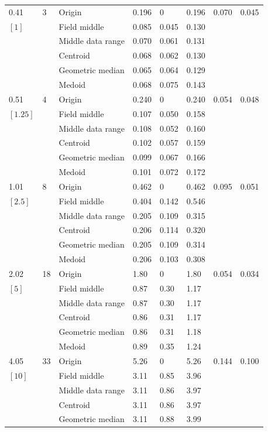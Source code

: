 \documentclass[phd]{ndsu-thesis-2022}
\begin{document}
{{\begin{ThreePartTable}
\begin{longtable}{lll lll ll}
0.41 & 3 & Origin  & 0.196 & 0 & 0.196 & 0.070 & 0.045 \\
$[1]$ &  & Field middle  & 0.085 & 0.045 & 0.130 \\
 &  & Middle data range  & 0.070 & 0.061 & 0.131 \\
 &  & Centroid & 0.068 & 0.062 & 0.130 \\
 &  & Geometric median & 0.065 & 0.064 & 0.129 \\
 &  & Medoid  & 0.068 & 0.075 & 0.143 \\
\midrule
0.51 & 4 & Origin  & 0.240 & 0 & 0.240 & 0.054 & 0.048 \\
$[1.25]$ &  & Field middle  & 0.107 & 0.050 & 0.158 \\
 &  & Middle data range  & 0.108 & 0.052 & 0.160 \\
 &  & Centroid & 0.102 & 0.057 & 0.159 \\
 &  & Geometric median & 0.099 & 0.067 & 0.166 \\
 &  & Medoid  & 0.101 & 0.072 & 0.172 \\
\midrule
1.01 & 8 & Origin  & 0.462 & 0 & 0.462 & 0.095 & 0.051 \\
$[2.5]$ &  & Field middle  & 0.404 & 0.142 & 0.546 \\
 &  & Middle data range  & 0.205 & 0.109 & 0.315 \\
 &  & Centroid & 0.206 & 0.114 & 0.320 \\
 &  & Geometric median & 0.205 & 0.109 & 0.314 \\
 &  & Medoid  & 0.206 & 0.103 & 0.308 \\
\midrule
2.02 & 18 & Origin  & 1.80 & 0 & 1.80 & 0.054 & 0.034 \\
$[5]$ &  & Field middle  & 0.87 & 0.30 & 1.17 \\
 &  & Middle data range  & 0.87 & 0.30 & 1.17 \\
 &  & Centroid & 0.86 & 0.31 & 1.17 \\
 &  & Geometric median & 0.86 & 0.31 & 1.18 \\
 &  & Medoid  & 0.89 & 0.35 & 1.24 \\
\midrule
4.05 & 33 & Origin  & 5.26 & 0 & 5.26 & 0.144 & 0.100 \\
$[10]$ &  & Field middle  & 3.11 & 0.85 & 3.96 \\
 &  & Middle data range  & 3.11 & 0.86 & 3.97 \\
 &  & Centroid & 3.11 & 0.86 & 3.97 \\
 &  & Geometric median & 3.11 & 0.88 & 3.99 \\

\end{longtable}
\end{ThreePartTable}}}
\end{document}
